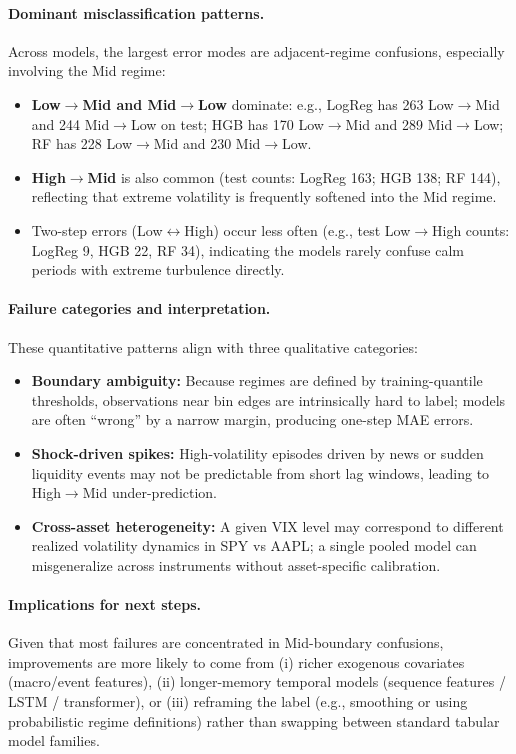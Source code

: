 \documentclass[11pt]{article}
\begin{document}
\paragraph{Dominant misclassification patterns.}
Across models, the largest error modes are adjacent-regime confusions, especially involving the Mid regime:
\begin{itemize}
    \item \textbf{Low$\rightarrow$Mid and Mid$\rightarrow$Low} dominate: e.g., LogReg has 263 Low$\rightarrow$Mid and 244 Mid$\rightarrow$Low on test; HGB has 170 Low$\rightarrow$Mid and 289 Mid$\rightarrow$Low; RF has 228 Low$\rightarrow$Mid and 230 Mid$\rightarrow$Low.
    \item \textbf{High$\rightarrow$Mid} is also common (test counts: LogReg 163; HGB 138; RF 144), reflecting that extreme volatility is frequently softened into the Mid regime.
    \item Two-step errors (Low$\leftrightarrow$High) occur less often (e.g., test Low$\rightarrow$High counts: LogReg 9, HGB 22, RF 34), indicating the models rarely confuse calm periods with extreme turbulence directly.
\end{itemize}

\paragraph{Failure categories and interpretation.}
These quantitative patterns align with three qualitative categories:
\begin{itemize}
    \item \textbf{Boundary ambiguity:} Because regimes are defined by training-quantile thresholds, observations near bin edges are intrinsically hard to label; models are often ``wrong'' by a narrow margin, producing one-step MAE errors.
    \item \textbf{Shock-driven spikes:} High-volatility episodes driven by news or sudden liquidity events may not be predictable from short lag windows, leading to High$\rightarrow$Mid under-prediction.
    \item \textbf{Cross-asset heterogeneity:} A given VIX level may correspond to different realized volatility dynamics in SPY vs AAPL; a single pooled model can misgeneralize across instruments without asset-specific calibration.
\end{itemize}

\paragraph{Implications for next steps.}
Given that most failures are concentrated in Mid-boundary confusions, improvements are more likely to come from (i) richer exogenous covariates (macro/event features), (ii) longer-memory temporal models (sequence features / LSTM / transformer), or (iii) reframing the label (e.g., smoothing or using probabilistic regime definitions) rather than swapping between standard tabular model families.
\end{document}
